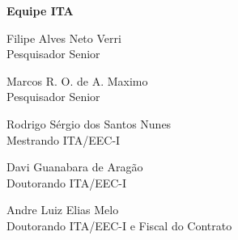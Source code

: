 
\vspace*{2cm}    %
\begin{flushright}
	
	\textbf{Equipe ITA}\\
	\vspace*{1cm}
	
	Filipe Alves Neto Verri \\
	Pesquisador Senior\\
	\vspace*{1cm}
	
	Marcos R. O. de A. Maximo\\
	Pesquisador Senior\\
	\vspace*{1cm}
	
	Rodrigo Sérgio dos Santos Nunes\\
	Mestrando ITA/EEC-I\\
	\vspace*{1cm}
	
	Davi Guanabara de Aragão\\
	Doutorando ITA/EEC-I\\
	\vspace*{1cm}
	
	Andre Luiz Elias Melo\\
	Doutorando ITA/EEC-I e Fiscal do Contrato\\
	\vspace*{1cm}

\end{flushright}
